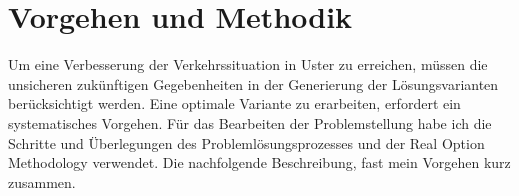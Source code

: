 %
%            
%
%
%

\chapter{Vorgehen und Methodik}
\label{chap:Vorgehen}


Um eine Verbesserung der Verkehrssituation in Uster zu erreichen, müssen die unsicheren zukünftigen Gegebenheiten in der Generierung der Lösungsvarianten berücksichtigt werden. Eine optimale Variante zu erarbeiten, erfordert ein systematisches Vorgehen. 
Für das Bearbeiten der Problemstellung habe ich die Schritte und Überlegungen des Problemlösungsprozesses und der Real Option Methodology verwendet. Die nachfolgende Beschreibung, fast mein Vorgehen kurz zusammen.

